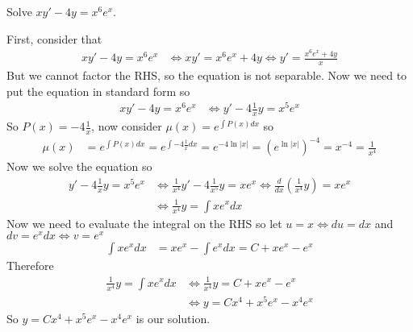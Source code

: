 \documentclass[notes.tex]{subfiles}
\begin{document}
\begin{exercise}
    Solve $xy' - 4y = x^6 e^x$.
\end{exercise}
\begin{solution}
    First, consider that
    \begin{align*}
        xy' - 4y = x^6 e^x
        &\iff xy' = x^6 e^x + 4y
        \iff y' = \frac{x^6 e^x + 4y}{x}
    \end{align*}
    But we cannot factor the RHS, so the equation is not separable. Now we need to put the equation in standard form so
    \begin{align*}
        xy' - 4y = x^6 e^x
        &\iff y' - 4\frac{1}{x}y = x^5 e^x
    \end{align*}
    So $P(x) = -4\frac{1}{x}$, now consider $\mu(x) = e^{\int P(x)dx}$ so
    \begin{align*}
        \mu(x)
        &= e^{\int P(x)dx}
        = e^{\int -4\frac{1}{x}dx}
        = e^{-4\ln|x|}
        = (e^{\ln|x|})^{-4}
        = x^{-4}
        = \frac{1}{x^4}
    \end{align*}
    Now we solve the equation so
    \begin{align*}
        y' - 4\frac{1}{x}y = x^5 e^x
        &\iff \frac{1}{x^4} y' - 4\frac{1}{x^5}y = x e^x
        \iff \frac{d}{dx}\left( \frac{1}{x^4}y \right) = x e^x \\
        &\iff \frac{1}{x^4}y = \int x e^x dx
    \end{align*}
    Now we need to evaluate the integral on the RHS so let $u = x \iff du = dx$ and $dv = e^x dx \iff v = e^x$
    \begin{align*}
        \int x e^x dx
        &= x e^x - \int e^x dx
        = C + x e^x - e^x
    \end{align*}
    Therefore
    \begin{align*}
        \frac{1}{x^4}y = \int x e^x dx
        &\iff \frac{1}{x^4}y = C + x e^x - e^x \\
        &\iff y = Cx^4 + x^5 e^x - x^4 e^x
    \end{align*}
    So $y = Cx^4 + x^5 e^x - x^4 e^x$ is our solution.
\end{solution}
\end{document}

